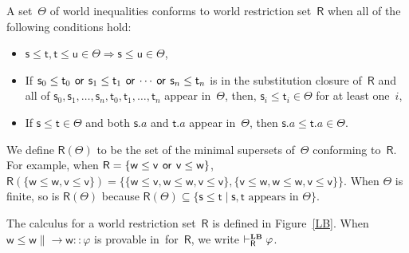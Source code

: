    A set~$\Theta$ of world inequalities
   conforms to world restriction set~$\mathsf R$ when all of the
   following conditions hold:
   \begin{itemize}
    \item $\mathsf s\le \mathsf t, \mathsf t\le \mathsf u\in
	  \Theta\Longrightarrow
	  \mathsf s\le \mathsf u\in\Theta$,
    \item If $\mathsf{s}_0\le \mathsf{t}_0 \,\mathbin{\mathsf{or}}\, \mathsf{s}_1\le \mathsf
	  {t}_1\,\mathbin{\mathsf{or}}\,
	  \cdots\,\mathbin{\mathsf{or}}\, \mathsf{s}_n\le
	  \mathsf{t}_n$ is in the substitution
	  closure of~$\mathsf R$  and all of
	  $\mathsf{s}_0,\mathsf{s}_1,\ldots,\mathsf{s}_n,
	  \mathsf{t}_0,\mathsf{t}_1,\ldots, \mathsf{t}_n$ appear in~$\Theta$, then,
	  $\mathsf{s}_i\le \mathsf{t}_i\in\Theta$ for at least
	  one~${i}$,
    \item If $\mathsf s\le\mathsf t\in\Theta$ and both $\mathsf s.a$ and
	  $\mathsf t.a$ appear in~$\Theta$, then $\mathsf s.a\le\mathsf
	  t.a\in \Theta$.
   \end{itemize}
   We define $\mathsf R(\Theta)$ to be the set of the minimal
   supersets of~$\Theta$ conforming to~$\mathsf R$.
   For example, when $\mathsf R=\{\mathsf w\le \mathsf v\,\mathbin{\mathsf{or}}\,\mathsf v\le \mathsf
   w\}$,
   $\mathsf R(\{\mathsf w\le \mathsf w, \mathsf v\le \mathsf v\}) =
   \{\{\mathsf w\le \mathsf v, \mathsf w\le \mathsf w, \mathsf v \le
   \mathsf v\}, \{\mathsf v \le
   \mathsf w, \mathsf w\le \mathsf w, \mathsf v\le \mathsf v\}\}$\enspace.
   When $\Theta$ is finite, so is $\mathsf R(\Theta)$ because $\mathsf
   R(\Theta)\subseteq \{\mathsf s\le\mathsf
   t\mid\mathsf s,\mathsf t\mbox{ appears in }\Theta\}$.

   \begin{definition}
    The calculus\,\LB\,for a world restriction set~$\mathsf R$ is defined in Figure~\ref{LB}.
    When $\mathsf w\le \mathsf w\parallel \rightarrow \mathsf
    w::\varphi$ is provable in \LB\,for~$\mathsf R$,
    we write $\vdashRLB\varphi$.
   \end{definition}

